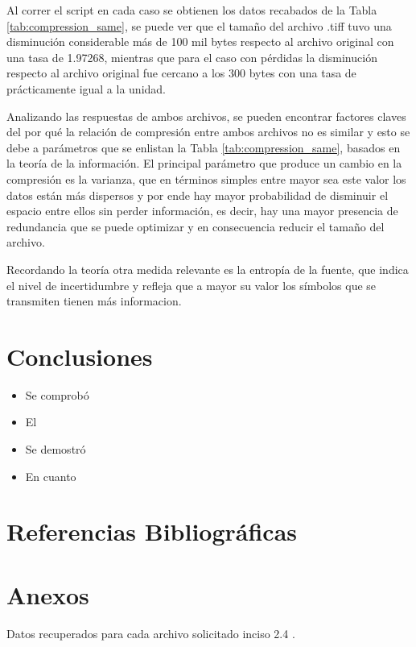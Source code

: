 \documentclass[conference,onecolumn,12pt]{IEEEtran}
\numberwithin{equation}{subsection}
\begin{document}
Al correr el script en cada caso se obtienen los datos recabados de la Tabla \ref{tab:compression_same}, se puede ver que el tamaño del archivo .tiff tuvo una disminución considerable más de 100 mil bytes respecto al archivo original con una tasa de 1.97268, mientras que para el caso con pérdidas la disminución respecto al archivo original fue cercano a los 300 bytes con una tasa de prácticamente igual a la unidad.

Analizando las respuestas de ambos archivos, se pueden encontrar factores claves del por qué la relación de compresión entre ambos archivos no es similar y esto se debe a parámetros que se enlistan la Tabla \ref{tab:compression_same}, basados en la teoría de la información. El principal parámetro que produce un cambio en la compresión es la varianza, que en términos simples entre mayor sea este valor los datos están más dispersos y por ende hay mayor probabilidad de disminuir el espacio entre ellos sin perder información, es decir, hay una mayor presencia de redundancia que se puede optimizar y en consecuencia reducir el tamaño del archivo.

Recordando la teoría otra medida relevante es la entropía de la fuente, que indica el nivel de incertidumbre y refleja que a mayor su valor los símbolos que se transmiten tienen más informacion.
\section{Conclusiones} 

\begin{itemize}

\item Se comprobó 

\item El 

\item Se demostró 

\item  En cuanto

\end{itemize}


\section{Referencias Bibliográficas}
\printbibliography[heading=none]

\section{Anexos}
Datos recuperados para cada archivo solicitado inciso 2.4 .
\end{document}
